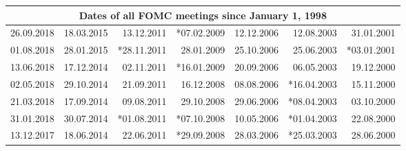 \documentclass[11pt,a4paper,english,oneside]{book}
\numberwithin{equation}{chapter}
\begin{document}
\begin{table}[h] %
	\centering %
	\begin{tabular}{r r r r r r r } %
		\toprule %
		\multicolumn{7}{c}{Dates of all FOMC meetings since January 1, 1998} \\
		\midrule %
						26.09.2018 & 18.03.2015 & 13.12.2011 & *07.02.2009 & 12.12.2006 & 12.08.2003 & 31.01.2001 \\
						01.08.2018 & 28.01.2015 & *28.11.2011 & 28.01.2009 & 25.10.2006 & 25.06.2003 & *03.01.2001 \\
						13.06.2018 & 17.12.2014 & 02.11.2011 & *16.01.2009 & 20.09.2006 & 06.05.2003 & 19.12.2000 \\
						02.05.2018 & 29.10.2014 & 21.09.2011 & 16.12.2008 & 08.08.2006 & *16.04.2003 & 15.11.2000 \\
						21.03.2018 & 17.09.2014 & 09.08.2011 & 29.10.2008 & 29.06.2006 & *08.04.2003 & 03.10.2000 \\
						31.01.2018 & 30.07.2014 & *01.08.2011 & *07.10.2008 & 10.05.2006 & *01.04.2003 & 22.08.2000 \\
						13.12.2017 & 18.06.2014 & 22.06.2011 & *29.09.2008 & 28.03.2006 & *25.03.2003 & 28.06.2000 \\

\end{tabular}
\end{table}
\end{document}
